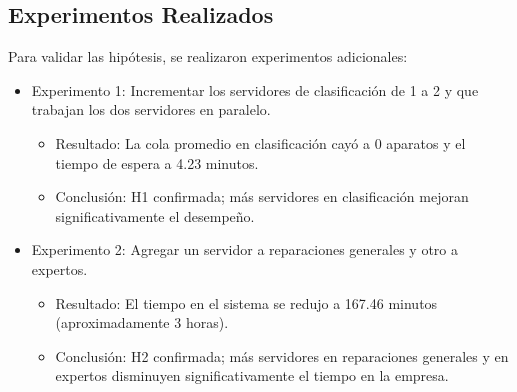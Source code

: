 \documentclass[12pt]{article}
\begin{document}
\subsection{Experimentos Realizados}
Para validar las hipótesis, se realizaron experimentos adicionales:
\begin{itemize}
    \item Experimento 1: Incrementar los servidores de clasificación de 1 a 2 y que trabajan los dos servidores en paralelo.
    \begin{itemize}
        \item Resultado: La cola promedio en clasificación cayó a 0 aparatos y el tiempo de espera a 4.23 minutos.
        \item Conclusión: H1 confirmada; más servidores en clasificación mejoran significativamente el desempeño.
    \end{itemize}
    \item Experimento 2: Agregar un servidor a reparaciones generales y otro a expertos.
    \begin{itemize}
        \item Resultado: El tiempo en el sistema se redujo a 167.46 minutos (aproximadamente 3 horas).
        \item Conclusión: H2 confirmada; más servidores en reparaciones generales y en expertos disminuyen significativamente el tiempo en la empresa.
    \end{itemize}
\end{itemize}
\end{document}

